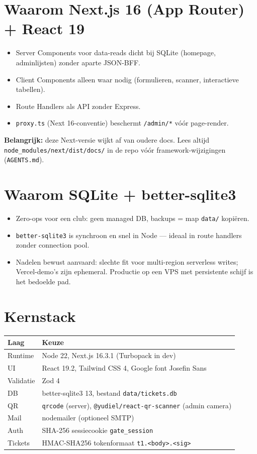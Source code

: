 \documentclass[11pt,a4paper]{report}
\begin{document}
\section{Waarom Next.js 16 (App Router) + React 19}
\begin{itemize}[leftmargin=*]
  \item Server Components voor data-reads dicht bij SQLite (homepage, adminlijsten) zonder aparte JSON-BFF.
  \item Client Components alleen waar nodig (formulieren, scanner, interactieve tabellen).
  \item Route Handlers als API zonder Express.
  \item \texttt{proxy.ts} (Next 16-conventie) beschermt \texttt{/admin/*} vóór page-render.
\end{itemize}
\textbf{Belangrijk:} deze Next-versie wijkt af van oudere docs. Lees altijd
\texttt{node\_modules/next/dist/docs/} in de repo vóór framework-wijzigingen (\texttt{AGENTS.md}).

\section{Waarom SQLite + better-sqlite3}
\begin{itemize}[leftmargin=*]
  \item Zero-ops voor een club: geen managed DB, backups = map \texttt{data/} kopiëren.
  \item \texttt{better-sqlite3} is synchroon en snel in Node --- ideaal in route handlers zonder connection pool.
  \item Nadelen bewust aanvaard: slechte fit voor multi-region serverless writes; Vercel-demo's zijn ephemeral.
    Productie op een VPS met persistente schijf is het bedoelde pad.
\end{itemize}

\section{Kernstack}
\begin{tabularx}{\textwidth}{@{}lX@{}}
\toprule
\textbf{Laag} & \textbf{Keuze} \\
\midrule
Runtime & Node 22, Next.js 16.3.1 (Turbopack in dev) \\
UI & React 19.2, Tailwind CSS 4, Google font Josefin Sans \\
Validatie & Zod 4 \\
DB & better-sqlite3 13, bestand \texttt{data/tickets.db} \\
QR & \texttt{qrcode} (server), \texttt{@yudiel/react-qr-scanner} (admin camera) \\
Mail & nodemailer (optioneel SMTP) \\
Auth & SHA-256 sessiecookie \texttt{gate\_session} \\
Tickets & HMAC-SHA256 tokenformaat \texttt{t1.<body>.<sig>} \\
\bottomrule
\end{tabularx}
\end{document}
